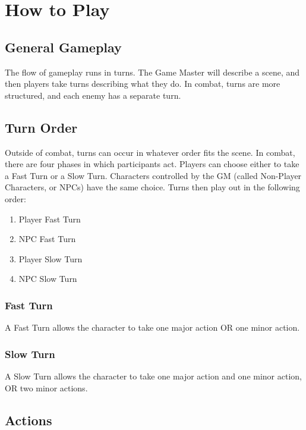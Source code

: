 \chapter{How to Play}

\begin{multicols}{2}

\section{General Gameplay}

The flow of gameplay runs in turns. The Game Master will
describe a scene, and then players take turns describing
what they do. In combat, turns are more structured, and each
enemy has a separate turn.

\section{Turn Order}

Outside of combat, turns can occur in whatever order fits the
scene. In combat, there are four phases in which participants
act. Players can choose either to take a Fast Turn or a Slow
Turn. Characters controlled by the GM (called Non-Player
Characters, or NPCs) have the same choice. Turns then play out
in the following order:

\begin{enumerate}
  \item Player Fast Turn
  \item NPC Fast Turn
  \item Player Slow Turn
  \item NPC Slow Turn
\end{enumerate}

\subsection{Fast Turn}

A Fast Turn allows the character to take one major action OR
one minor action.

\subsection{Slow Turn}

A Slow Turn allows the character to take one major action and
one minor action, OR two minor actions.

\section{Actions}


\end{multicols}
